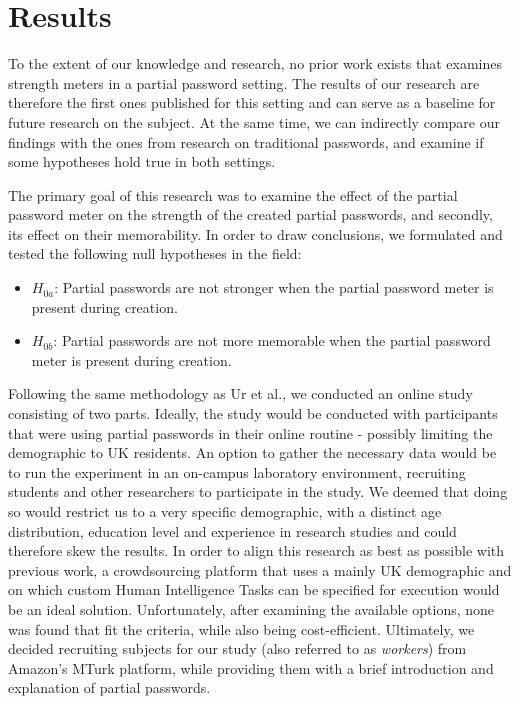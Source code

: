 
\chapter{Results}
\label{cha:results}
To the extent of our knowledge and research, no prior work exists that examines strength meters in a partial password setting. The results of our research are therefore the first ones published for this setting and can serve as a baseline for future research on the subject. At the same time, we can indirectly compare our findings with the ones from research on traditional passwords, and examine if some hypotheses hold true in both settings.

The primary goal of this research was to examine the effect of the partial password meter on the strength of the created partial passwords, and secondly, its effect on their memorability. In order to draw conclusions, we formulated and tested the following null hypotheses in the field:

\begin{itemize}
  \item[] $H_{0a}$: Partial passwords are not stronger when the partial password meter is present during creation.
  \item[] $H_{0b}$: Partial passwords are not more memorable when the partial password meter is present during creation.
\end{itemize}

Following the same methodology as Ur et al., we conducted an online study consisting of two parts. Ideally, the study would be conducted with participants that were using partial passwords in their online routine - possibly limiting the demographic to UK residents. An option to gather the necessary data would be to run the experiment in an on-campus laboratory environment, recruiting students and other researchers to participate in the study. We deemed that doing so would restrict us to a very specific demographic, with a distinct age distribution, education level and experience in research studies and could therefore skew the results. In order to align this research as best as possible with previous work, a crowdsourcing platform that uses a mainly UK demographic and on which custom Human Intelligence Tasks can be specified for execution would be an ideal solution. Unfortunately, after examining the available options, none was found that fit the criteria, while also being cost-efficient. Ultimately, we decided recruiting subjects for our study (also referred to as \emph{workers}) from Amazon's MTurk platform, while providing them with a brief introduction and explanation of partial passwords.

